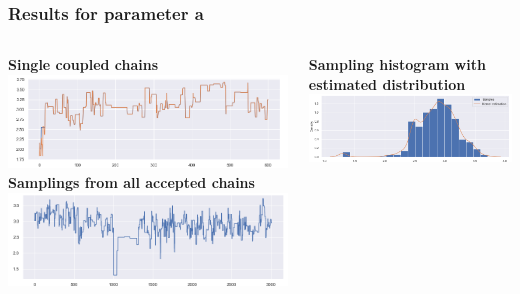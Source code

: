 \documentclass{beamer}
\begin{document}
\begin{frame}
	\frametitle{Results for parameter a}
	
	
		\begin{columns}
		
		\begin{column}{0.49\textwidth}
			\centering
			{\scriptsize \textbf{Single coupled chains}}\\
			\vspace{1.5mm}
			\includegraphics[width=0.85\columnwidth]{gk_all_pack/gk_all_chain_meeeting_0}
			\vspace{0.2cm}
			{	\scriptsize \textbf{Samplings from all accepted chains }}\\
			\includegraphics[width=\columnwidth]{gk_all_pack/gk_all_sampling_0}
		\end{column}
		\hspace{-6mm}
		\begin{column}{0.49\textwidth}
			\centering
			{\scriptsize \textbf{Sampling histogram with estimated distribution}}\\
			\vspace{3mm}
			\includegraphics[width=1.1\columnwidth]{gk_all_pack/gk_all_histogram_kernel_0}
		\end{column}
	\end{columns}
	

\end{frame}
\end{document}
